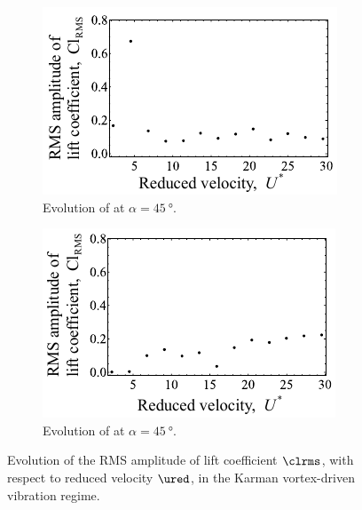 \documentclass[a4paper,fleqn]{cas-sc}
\begin{document}
\begin{figure}
  \centering
  \begin{subfigure}[h]{0.38\textwidth}
    \includegraphics[width=\textwidth]{figs/clRMS4}
    \caption{Evolution of at $\alpha = \SI{45}{\degree}$.}
    \label{fig:clRMS4}
  \end{subfigure}

  \begin{subfigure}[h]{0.38\textwidth}
    \includegraphics[width=\textwidth]{figs/clRMS5}
    \caption{Evolution of at $\alpha = \SI{45}{\degree}$.}
    \label{fig:clRMS5}
  \end{subfigure}

  \caption{Evolution of the RMS amplitude of lift coefficient $\clrms$,  with respect to reduced velocity $\ured$, in the Karman vortex-driven vibration regime.} \label{fig:clRMSKarman}
\end{figure}
\end{document}
